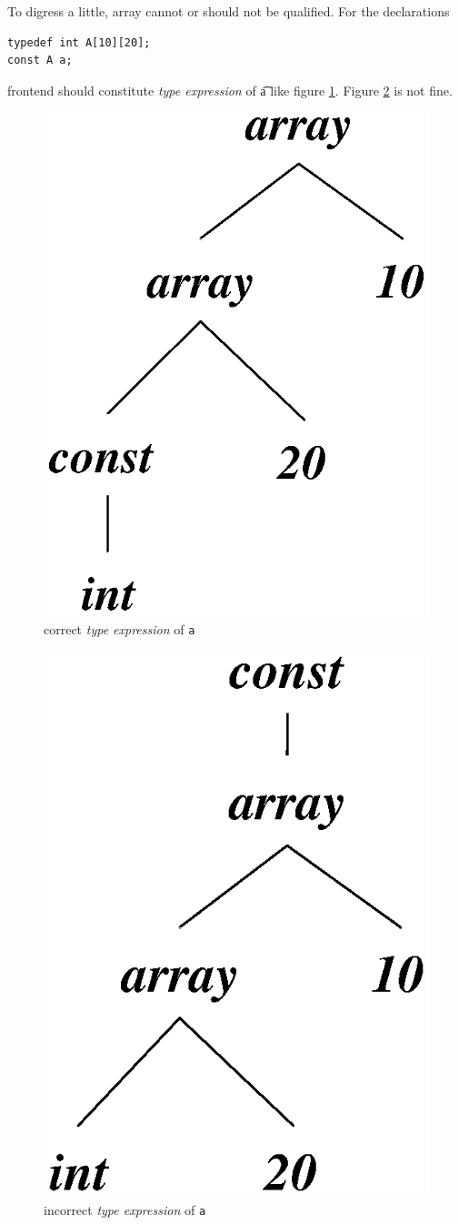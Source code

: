 To digress a little, array cannot or should not be qualified.
For the declarations
\begin{verbatim}
typedef int A[10][20];
const A a;
\end{verbatim}
frontend should constitute {\em type expression} of {\t{a}}
like figure \ref{type007}. Figure \ref{type008} is not fine.
\begin{figure}[htbp]
\begin{center}
\includegraphics[width=0.4\linewidth,height=0.5\linewidth]{correct_array.eps}
\caption{correct {\em type expression} of {\tt{a}}}
\label{type007}
\end{center}
\end{figure}
\begin{figure}[htbp]
\begin{center}
\includegraphics[width=0.4\linewidth,height=0.5\linewidth]{incorrect_array.eps}
\caption{incorrect {\em type expression} of {\tt{a}}}
\label{type008}
\end{center}
\end{figure}

